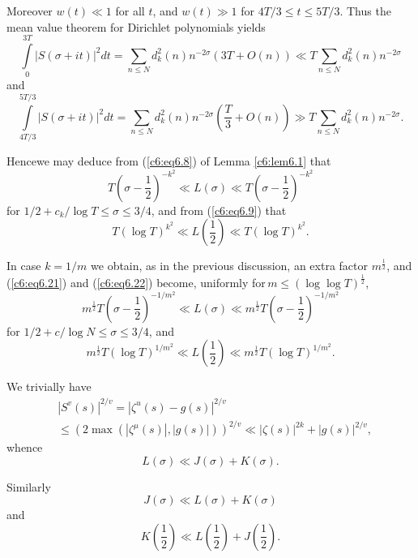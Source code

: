 Moreover $w(t) \ll 1$ for all $t$, and $w(t) \gg 1$ for $4T / 3 \leq t
\leq 5T/3$. Thus the mean value theorem for Dirichlet polynomials
yields 
$$
\int\limits^{3T}_0 |S(\sigma + it)|^2 dt = \sum\limits_{n \leq N}
d^2_k (n) n^{-2\sigma} (3T+O(n))  \ll T \sum\limits_{n \leq N}
d^{2}_k(n) n^{-2\sigma} 
$$ 
and
$$
\int\limits^{5T/3}_{4T/3} |S(\sigma + it)|^2 dt = \sum\limits_{n \leq
  N} d^2_k (n) n^{-2 \sigma} \left(\frac{T}{3} +  O(n)\right) \gg T
\sum\limits_{n\leq N} d^2_k (n) n^{-2\sigma}. 
$$

Hence\pageoriginale we may deduce from (\ref{c6:eq6.8}) of Lemma
\ref{c6:lem6.1} that 
\begin{equation}
T \left(\sigma -\frac{1}{2} \right)^{-k^2} \ll L(\sigma) \ll T
\left(\sigma -\frac{1}{2} \right)^{-k^2}\label{c6:eq6.21} 
\end{equation}
for $1/2 + c_k / \log T \leq \sigma \leq 3/4$, and from
(\ref{c6:eq6.9}) that  
\begin{equation}
T(\log T)^{k^2} \ll L \left(\frac{1}{2} \right) \ll T(\log
T)^{k^2}. \label{c6:eq6.22} 
\end{equation}

In case $k = 1/m$ we obtain, as in the previous discussion, an extra
factor $m^{\frac{1}{2}}$, and (\ref{c6:eq6.21}) and (\ref{c6:eq6.22})
become, uniformly for\,$m \leq\!(\log \log T)^{\frac{1}{2}}$,  
\begin{equation}
m^{\frac{1}{2}} T \left(\sigma -\frac{1}{2} \right)^{-1/m^2} \ll
L(\sigma) \ll m^{\frac{1}{2}} T\left(\sigma -\frac{1}{2}
\right)^{-1/m^2}\label{c6:eq6.23} 
\end{equation}
for $1/2+c/\log N \leq \sigma \leq 3/4$, and 
\begin{equation}
  m^{\frac{1}{2}} T (\log T)^{1/m^2} \ll L\left(\frac{1}{2}\right) \ll 
  m^{\frac{1}{2}} T (\log T)^{1/m^2}. \label{c6:eq6.24}
\end{equation}

We trivially have 
\begin{align*}
& |S^v (s)|^{2/v} = |\zeta^{u} (s) - g(s)|^{2/v}\\
& \leq (2\max (|\zeta^{\mu} (s)|, |g(s)|))^{2/v} \ll |\zeta(s)|^{2k} +
|g(s)|^{2/v}, 
\end{align*}
whence
\begin{equation}
L(\sigma) \ll J(\sigma) + K(\sigma).\label{c6:eq6.25}
\end{equation}

Similarly
\begin{equation}
J(\sigma) \ll L(\sigma) + K(\sigma) \label{c6:eq6.26}
\end{equation}
and 
\begin{equation}
K \left(\frac{1}{2} \right) \ll L \left(\frac{1}{2} \right) + J
\left(\frac{1}{2} \right).\label{c6:eq6.27} 
\end{equation}

